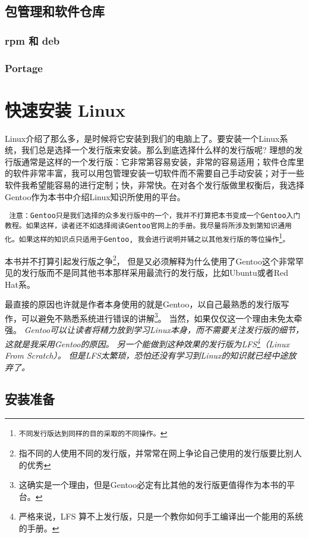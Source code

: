 \documentclass[amstex]{ctexbook}
\newenvironment{notice}{\tt}{}
\begin{document}
\section{包管理和软件仓库}

\subsection*{rpm 和 deb}
\subsection*{Portage}


\chapter{快速安装 Linux}
Linux介绍了那么多，是时候将它安装到我们的电脑上了。要安装一个Linux系统，我们总是选择一个发行版来安装。那么到底选择什么样的发行版呢? 理想的发行版通常是这样的一个发行版：它非常第容易安装，非常的容易适用；软件仓库里的软件非常丰富，我可以用包管理安装一切软件而不需要自己手动安装；对于一些软件我希望能容易的进行定制；快，非常快。在对各个发行版做里权衡后，我选择Gentoo作为本书中介绍Linux知识所使用的平台。


\begin{notice}
 注意：Gentoo只是我们选择的众多发行版中的一个，我并不打算把本书变成一个Gentoo入门教程。如果这样，读者还不如选择阅读Gentoo官网上的手册。我尽量将所涉及到第知识通用化。如果这样的知识点只适用于Gentoo, 我会进行说明并辅之以其他发行版的等位操作\footnote{不同发行版达到同样的目的采取的不同操作。}。
\end{notice}

本书并不打算引起发行版之争\footnote{指不同的人使用不同的发行版，并常常在网上争论自己使用的发行版要比别人的优秀}，
但是又必须解释为什么使用了Gentoo这个非常罕见的发行版而不是同其他书本那样采用最流行的发行版，比如Ubuntu或者Red Hat系。

最直接的原因也许就是作者本身使用的就是Gentoo，以自己最熟悉的发行版写作，可以避免不熟悉系统进行错误的讲解\footnote{这确实是一个理由，但是Gentoo必定有比其他的发行版更值得作为本书的平台。}。
当然，如果仅仅这一个理由未免太牵强。
\it
Gentoo可以让读者将精力放到学习Linux本身，而不需要关注发行版的细节，这就是我采用Gentoo的原因。
\normalfont
另一个能做到这种效果的发行版为LFS\footnote{严格来说，LFS 算不上发行版，只是一个教你如何手工编译出一个能用的系统的手册。}（Linux From Scratch）。
但是LFS太繁琐，恐怕还没有学习到Linux的知识就已经中途放弃了。


\section{安装准备}
\end{document}
